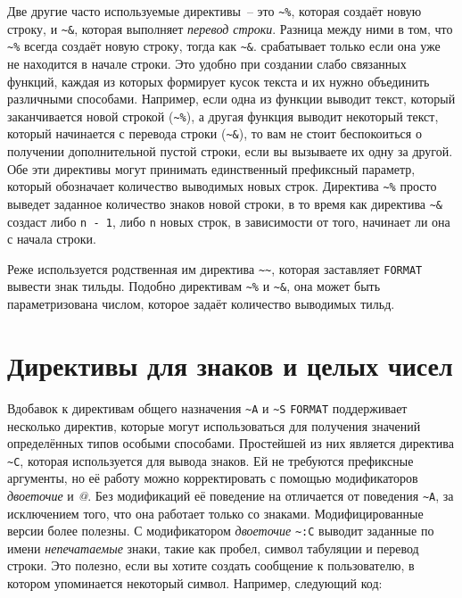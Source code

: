 Две другие часто используемые директивы~-- это \lstinline!~%!, которая создаёт новую
строку, и \lstinline!~&!, которая выполняет \textit{перевод строки}. Разница между ними в
том, что \lstinline!~%! всегда создаёт новую строку, тогда как \lstinline!~&!.
срабатывает только если она уже не находится в начале строки. Это удобно при создании
слабо связанных функций, каждая из которых формирует кусок текста и их нужно объединить
различными способами. Например, если одна из функции выводит текст, который заканчивается
новой строкой (\lstinline!~%!), а другая функция выводит некоторый текст, который
начинается с перевода строки (\lstinline!~&!), то вам не стоит беспокоиться о получении
дополнительной пустой строки, если вы вызываете их одну за другой. Обе эти директивы могут
принимать единственный префиксный параметр, который обозначает количество выводимых новых
строк. Директива \lstinline!~%! просто выведет заданное количество знаков новой строки, в
то время как директива \lstinline!~&! создаст либо \lstinline{n - 1}, либо \lstinline{n}
новых строк, в зависимости от того, начинает ли она с начала строки.

Реже используется родственная им директива \lstinline!~~!, которая заставляет
\lstinline{FORMAT} вывести знак тильды. Подобно директивам \lstinline!~%! и \lstinline!~&!,
она может быть параметризована числом, которое задаёт количество выводимых тильд.

\section{Директивы для знаков и целых чисел}
\label{ch18:chars-numbers}

Вдобавок к директивам общего назначения \lstinline!~A! и \lstinline!~S! \lstinline{FORMAT}
поддерживает несколько директив, которые могут использоваться для получения значений
определённых типов особыми способами. Простейшей из них является директива \lstinline!~C!,
которая используется для вывода знаков. Ей не требуются префиксные аргументы, но её работу
можно корректировать с помощью модификаторов \textit{двоеточие} и \textit{@}. Без
модификаций её поведение на отличается от поведения \lstinline!~A!, за исключением того,
что она работает только со знаками. Модифицированные версии более полезны. С модификатором
\textit{двоеточие} \lstinline!~:C! выводит заданные по имени \textit{непечатаемые} знаки,
такие как пробел, символ табуляции и перевод строки. Это полезно, если вы хотите создать
сообщение к пользователю, в котором упоминается некоторый символ. Например, следующий код:

